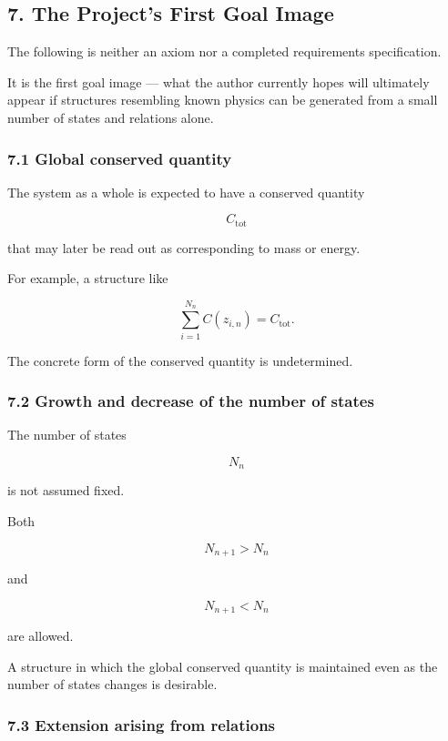 \documentclass[
  a4paper,
]{article}
\begin{document}
\subsection{7. The Project's First Goal
Image}\label{the-projects-first-goal-image}

The following is neither an axiom nor a completed requirements
specification.

It is the first goal image --- what the author currently hopes will
ultimately appear if structures resembling known physics can be
generated from a small number of states and relations alone.

\subsubsection{7.1 Global conserved
quantity}\label{global-conserved-quantity}

The system as a whole is expected to have a conserved quantity

\[
C_{\mathrm{tot}}
\]

that may later be read out as corresponding to mass or energy.

For example, a structure like

\[
\boxed{
\sum_{i=1}^{N_n} C(z_{i,n})=C_{\mathrm{tot}}.
}
\]

The concrete form of the conserved quantity is undetermined.

\subsubsection{7.2 Growth and decrease of the number of
states}\label{growth-and-decrease-of-the-number-of-states}

The number of states

\[
N_n
\]

is not assumed fixed.

Both

\[
N_{n+1}>N_n
\]

and

\[
N_{n+1}<N_n
\]

are allowed.

A structure in which the global conserved quantity is maintained even as
the number of states changes is desirable.

\subsubsection{7.3 Extension arising from
relations}\label{extension-arising-from-relations}
\end{document}
